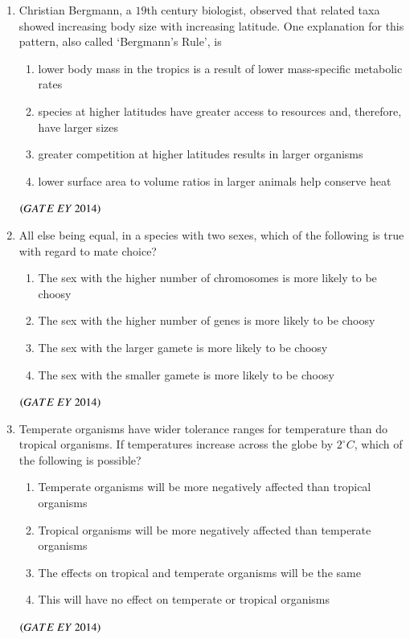 \documentclass[journal]{IEEEtran}
\numberwithin{equation}{enumi}
\numberwithin{figure}{enumi}
\begin{document}
\begin{enumerate}
    \item Christian Bergmann, a $19$th century biologist, observed that related taxa showed increasing body size with increasing latitude. One explanation for this pattern, also called `Bergmann's Rule', is
    \begin{enumerate}
        \item lower body mass in the tropics is a result of lower mass-specific metabolic rates
        \item species at higher latitudes have greater access to resources and, therefore, have larger sizes
        \item greater competition at higher latitudes results in larger organisms
        \item lower surface area to volume ratios in larger animals help conserve heat
    \end{enumerate}
    \hfill{$\brak{ GATE\ EY\ 2014}$}
    \bigskip
    
    \item All else being equal, in a species with two sexes, which of the following is true with regard to mate choice?
    \begin{enumerate}
        \item The sex with the higher number of chromosomes is more likely to be choosy
        \item The sex with the higher number of genes is more likely to be choosy
        \item The sex with the larger gamete is more likely to be choosy
        \item The sex with the smaller gamete is more likely to be choosy
    \end{enumerate}
    \hfill{$\brak{ GATE\ EY\ 2014}$}
    \bigskip
    
    \item Temperate organisms have wider tolerance ranges for temperature than do tropical organisms. If temperatures increase across the globe by $2^{\circ}C$, which of the following is possible?
    \begin{enumerate}
        \item Temperate organisms will be more negatively affected than tropical organisms
        \item Tropical organisms will be more negatively affected than temperate organisms
        \item The effects on tropical and temperate organisms will be the same
        \item This will have no effect on temperate or tropical organisms
    \end{enumerate}
    \hfill{$\brak{ GATE\ EY\ 2014}$}
    \bigskip
    

\end{enumerate}
\end{document}
